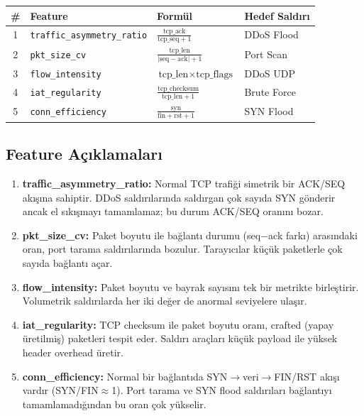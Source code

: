 \documentclass[12pt,a4paper]{article}
\begin{document}
\begin{table}[H]\centering
\begin{tabularx}{\textwidth}{clXl}
\toprule
\# & Feature & Formül & Hedef Saldırı \\
\midrule
1 & \texttt{traffic\_asymmetry\_ratio} & $\frac{\text{tcp\_ack}}{\text{tcp\_seq}+1}$ & DDoS Flood \\[4pt]
2 & \texttt{pkt\_size\_cv} & $\frac{\text{tcp\_len}}{|\text{seq}-\text{ack}|+1}$ & Port Scan \\[4pt]
3 & \texttt{flow\_intensity} & $\text{tcp\_len} \times \text{tcp\_flags}$ & DDoS UDP \\[4pt]
4 & \texttt{iat\_regularity} & $\frac{\text{tcp\_checksum}}{\text{tcp\_len}+1}$ & Brute Force \\[4pt]
5 & \texttt{conn\_efficiency} & $\frac{\text{syn}}{\text{fin}+\text{rst}+1}$ & SYN Flood \\
\bottomrule
\end{tabularx}
\end{table}

\subsection{Feature Açıklamaları}
\begin{enumerate}[noitemsep]
  \item \textbf{traffic\_asymmetry\_ratio:} Normal TCP trafiği simetrik bir ACK/SEQ akışına sahiptir. DDoS saldırılarında saldırgan çok sayıda SYN gönderir ancak el sıkışmayı tamamlamaz; bu durum ACK/SEQ oranını bozar.
  \item \textbf{pkt\_size\_cv:} Paket boyutu ile bağlantı durumu (seq$-$ack farkı) arasındaki oran, port tarama saldırılarında bozulur. Tarayıcılar küçük paketlerle çok sayıda bağlantı açar.
  \item \textbf{flow\_intensity:} Paket boyutu ve bayrak sayısını tek bir metrikte birleştirir. Volumetrik saldırılarda her iki değer de anormal seviyelere ulaşır.
  \item \textbf{iat\_regularity:} TCP checksum ile paket boyutu oranı, crafted (yapay üretilmiş) paketleri tespit eder. Saldırı araçları küçük payload ile yüksek header overhead üretir.
  \item \textbf{conn\_efficiency:} Normal bir bağlantıda SYN$\to$veri$\to$FIN/RST akışı vardır (SYN/FIN$\approx$1). Port tarama ve SYN flood saldırıları bağlantıyı tamamlamadığından bu oran çok yükselir.
\end{enumerate}
\end{document}

